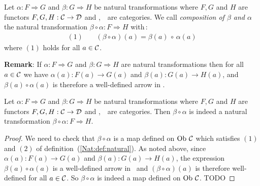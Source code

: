 \begin{defin}\label{Nat:def:composition}
    Let $\alpha:F\Rightarrow G$ and $\beta:G\Rightarrow H$ be natural
    transformations where $F,G$ and $H$ are functors $F,G,H:\mbox{$\cal C$}\to\mbox{$\cal D$}$
    and \Cat,\ \Dat\ are categories. We call {\em composition of $\beta$
    and $\alpha$} the natural transformation $\beta\circ\alpha:F\Rightarrow H$
    with\,:
        \begin{eqnarray*}
            (1)&\ &(\beta\circ\alpha)(a)=\beta(a)\,\circ\,\alpha(a)
        \end{eqnarray*}
    where $(1)$ holds for all $a\in\mbox{$\cal C$}$.
\end{defin}

{\bf Remark}: If $\alpha:F\Rightarrow G$ and $\beta:G\Rightarrow H$ are 
natural transformations then for all $a\in\mbox{$\cal C$}$ we have $\alpha(a):F(a)\to 
G(a)$ and $\beta(a):G(a)\to H(a)$, and $\beta(a)\circ\alpha(a)$ is therefore 
a well-defined arrow in \Dat.

\begin{prop}\label{Nat:prop:composition}
    Let $\alpha:F\Rightarrow G$ and $\beta:G\Rightarrow H$ be natural
    transformations where $F,G$ and $H$ are functors $F,G,H:\mbox{$\cal C$}\to\mbox{$\cal D$}$
    and \Cat,\ \Dat\ are categories. Then $\beta\circ\alpha$ is indeed
    a natural transformation $\beta\circ\alpha:F\Rightarrow H$.
\end{prop}
\begin{proof}
    We need to check that $\beta\circ\alpha$ is a map defined on
    $\mbox{\rm Ob}\ \mbox{$\cal C$}$ which satisfies $(1)$ and $(2)$ of 
    definition~(\ref{Nat:def:natural}). As noted above, since
    $\alpha(a):F(a)\to G(a)$ and $\beta(a):G(a)\to H(a)$, the expression
    $\beta(a)\circ\alpha(a)$ is a well-defined arrow in \Dat\ and 
    $(\beta\circ\alpha)(a)$ is therefore well-defined for all
    $a\in\mbox{$\cal C$}$. So $\beta\circ\alpha$ is indeed a map defined on $\mbox{\rm Ob}\ \mbox{$\cal C$}$.
    TODO
\end{proof}

